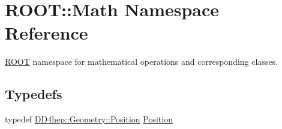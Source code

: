 \hypertarget{namespace_r_o_o_t_1_1_math}{
\section{ROOT::Math Namespace Reference}
\label{namespace_r_o_o_t_1_1_math}
}


\hyperlink{namespace_r_o_o_t}{ROOT} namespace for mathematical operations and corresponding classes.  
\subsection*{Typedefs}
\begin{DoxyCompactItemize}
\item 
typedef \hyperlink{namespace_d_d4hep_1_1_geometry_a55083902099d03506c6db01b80404900}{DD4hep::Geometry::Position} \hyperlink{namespace_r_o_o_t_1_1_math_ac2622efe8212cb8b8a8893efd5117de8}{Position}
\end{DoxyCompactItemize}
